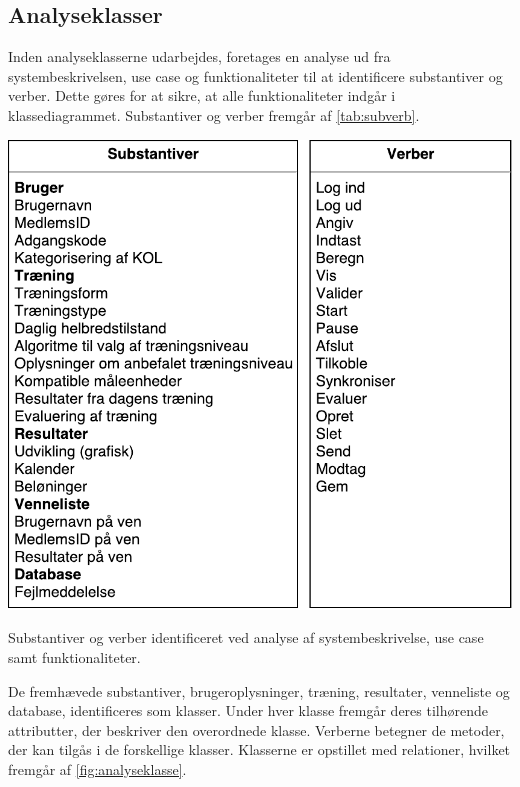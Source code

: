 \subsection{Analyseklasser}
Inden analyseklasserne udarbejdes, foretages en analyse ud fra systembeskrivelsen, use case og funktionaliteter til at identificere substantiver og verber. Dette gøres for at sikre, at alle funktionaliteter indgår i klassediagrammet. Substantiver og verber fremgår af \autoref{tab:subverb}.

\begin{table}[H]
\centering
\includegraphics[width=1\textwidth]{figures/aktivitetsdiagram/substantiveverber}
\caption{Substantiver og verber identificeret ved analyse af systembeskrivelse, use case samt funktionaliteter.}
\label{tab:subverb}
\end{table}

\noindent
De fremhævede substantiver, brugeroplysninger, træning, resultater, venneliste og database, identificeres som klasser. Under hver klasse fremgår deres tilhørende attributter, der beskriver den overordnede klasse. Verberne betegner de metoder, der kan tilgås i de forskellige klasser. Klasserne er opstillet med relationer, hvilket fremgår af \autoref{fig:analyseklasse}.

